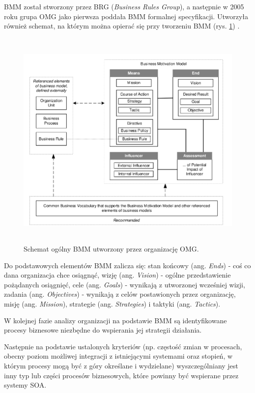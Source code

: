 BMM został stworzony przez BRG (\emph{Business Rules Group}), a następnie w 2005 roku grupa OMG jako pierwsza poddała BMM formalnej specyfikacji. Utworzyła również schemat, na którym można opierać się przy tworzeniu BMM (rys. \ref{BMM_schem}) \cite{AnaWesHal}.

\begin{figure}[h!tbp]
\begin{centering}
\includegraphics[width=12cm, height=11cm]{img/BMM.png}
\caption[Schemat ogólny BMM utworzony przez organizację OMG.]{Schemat ogólny BMM utworzony przez organizację OMG. \cite{BMMOmg}}\label{BMM_schem}
\end{centering}
\end{figure}

Do podstawowych elementów BMM zalicza się: stan końcowy (ang. \emph{Ends}) - coś co dana organizacja chce osiągnąć, wizję (ang. \emph{Vision}) - ogólne przedstawienie pożądanych osiągnięć, cele (ang. \emph{Goals}) - wynikają z utworzonej wcześniej wizji, zadania (ang. \emph{Objectives}) - wynikają z celów postawionych przez organizację, misję (ang. \emph{Mission}), strategie (ang. \emph{Strategies}) i taktyki (ang. \emph{Tactics}). \cite{AnaWesHal}

W kolejnej fazie analizy organizacji na podstawie BMM są identyfikowane procesy biznesowe niezbędne do wspierania jej strategii działania. 

Następnie na podstawie ustalonych kryteriów (np. częstość zmian w procesach, obecny poziom możliwej integracji z istniejącymi systemami oraz stopień, w którym procesy mogą być z góry określane i wydzielane) wyszczególniany jest inny typ lub części procesów biznesowych, które powinny być wspierane przez systemy SOA.

